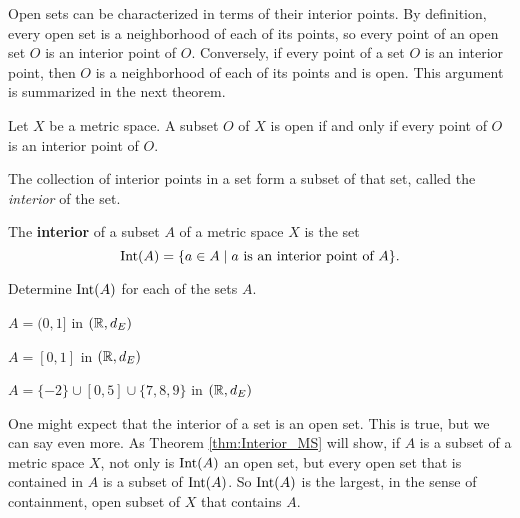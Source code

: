 \label{sec_interior_set}

Open sets can be characterized in terms of their interior points. By definition, every open set is a neighborhood of each of its points, so every point of an open set $O$ is an interior point of $O$. Conversely, if every point of a set $O$ is an interior point, then $O$ is a neighborhood of each of its points and is open. This argument is summarized in the next theorem. 

\begin{theorem} Let $X$ be a metric space. A subset $O$ of $X$ is open if and only if every point of $O$ is an interior point of $O$. 
\end{theorem}

The collection of interior points in a set form a subset of that set, called the \emph{interior} of the set.

\begin{definition} The \textbf{interior} of a subset $A$ of a metric space $X$ is the set
\[\text{Int}(A) = \{a \in A \mid a \text{ is an interior point of } A\}.\]
\end{definition}

\begin{activity} Determine $\text{Int}(A)$ for each of the sets $A$.
\ba
\item $A = (0,1]$ in $(\mathbb{R}, d_E)$

\item $A = [0,1]$ in $(\mathbb{R}, d_E)$

\item $A = \{-2\} \cup [0,5] \cup \{7,8,9\}$ in $(\mathbb{R},d_E)$

\ea
\end{activity}

\begin{comment}

\ActivitySolution
\ba
\item The interior of $A$ is the set $(0,1)$. 

\item The interior of $A$ is the set $(0,1)$. 

\item There are no open ball containing $-2$, $7$, $8$, or $9$ that is entirely contained in $A$. So the interior of $A$ is the set $(0,5)$. 

\ea

\end{comment}

One might expect that the interior of a set is an open set. This is true, but we can say even more. As Theorem \ref{thm:Interior_MS} will show, if $A$ is a subset of a metric space $X$, not only is $\text{Int}(A)$ an open set, but every open set that is contained in $A$ is a subset of $\text{Int}(A)$. So $\text{Int}(A)$ is the largest, in the sense of containment, open subset of $X$ that contains $A$. 

